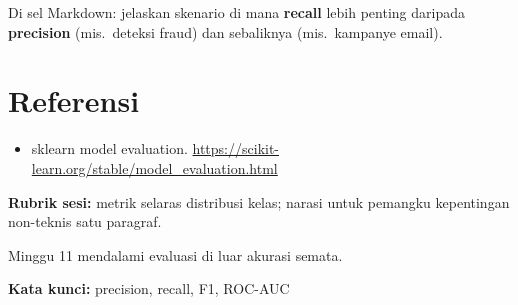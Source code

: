 \documentclass[../main.tex]{subfiles}
\begin{document}
\begin{contoh}
Di sel Markdown: jelaskan skenario di mana \textbf{recall} lebih penting daripada \textbf{precision} (mis.\ deteksi fraud) dan sebaliknya (mis.\ kampanye email).
\end{contoh}

\section{Referensi}

\begin{itemize}[leftmargin=*]
  \item sklearn model evaluation. \url{https://scikit-learn.org/stable/model_evaluation.html}
\end{itemize}

\begin{asesmen}
\textbf{Rubrik sesi:} metrik selaras distribusi kelas; narasi untuk pemangku kepentingan non-teknis satu paragraf.
\end{asesmen}

\begin{rangkuman}
Minggu 11 mendalami evaluasi di luar akurasi semata.

\textbf{Kata kunci:} precision, recall, F1, ROC-AUC
\end{rangkuman}
\end{document}
